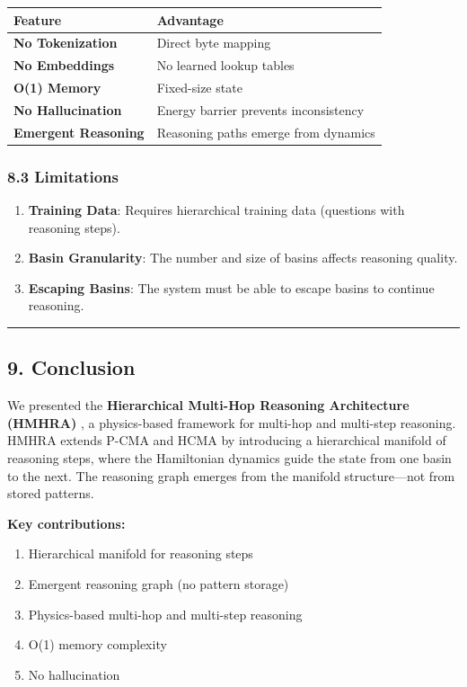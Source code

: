 \documentclass[
  11pt,
  a4paper,
]{article}
\providecommand{\tightlist}{%
  \setlength{\itemsep}{0pt}\setlength{\parskip}{0pt}}
\begin{document}
\begin{longtable}[]{@{}ll@{}}
\toprule\noalign{}
Feature & Advantage \\
\midrule\noalign{}
\endhead
\bottomrule\noalign{}
\endlastfoot
\textbf{No Tokenization} & Direct byte mapping \\
\textbf{No Embeddings} & No learned lookup tables \\
\textbf{O(1) Memory} & Fixed-size state \\
\textbf{No Hallucination} & Energy barrier prevents inconsistency \\
\textbf{Emergent Reasoning} & Reasoning paths emerge from dynamics \\
\end{longtable}

\subsubsection{8.3 Limitations}\label{limitations}

\begin{enumerate}
\def\labelenumi{\arabic{enumi}.}
\tightlist
\item
  \textbf{Training Data}: Requires hierarchical training data (questions
  with reasoning steps).
\item
  \textbf{Basin Granularity}: The number and size of basins affects
  reasoning quality.
\item
  \textbf{Escaping Basins}: The system must be able to escape basins to
  continue reasoning.
\end{enumerate}

\begin{center}\rule{0.5\linewidth}{0.5pt}\end{center}

\subsection{9. Conclusion}\label{conclusion}

We presented the \textbf{Hierarchical Multi-Hop Reasoning Architecture
(HMHRA)} , a physics-based framework for multi-hop and multi-step
reasoning. HMHRA extends P-CMA and HCMA by introducing a hierarchical
manifold of reasoning steps, where the Hamiltonian dynamics guide the
state from one basin to the next. The reasoning graph emerges from the
manifold structure---not from stored patterns.

\textbf{Key contributions:}

\begin{enumerate}
\def\labelenumi{\arabic{enumi}.}
\tightlist
\item
  Hierarchical manifold for reasoning steps
\item
  Emergent reasoning graph (no pattern storage)
\item
  Physics-based multi-hop and multi-step reasoning
\item
  O(1) memory complexity
\item
  No hallucination
\end{enumerate}
\end{document}
